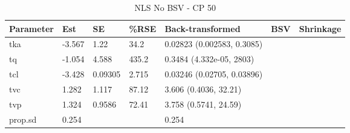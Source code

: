 \begin{table}
\centering\centering
\caption{NLS No BSV - CP 50}
\centering
\fontsize{8}{10}\selectfont
\begin{tabular}[t]{lllllll}
\toprule
\textbf{Parameter} & \textbf{Est} & \textbf{SE} & \textbf{\%RSE} & \textbf{Back-transformed} & \textbf{BSV} & \textbf{Shrinkage}\\
\midrule
tka & -3.567 & 1.22 & 34.2 & 0.02823 (0.002583, 0.3085) &  & \\
\midrule
tq & -1.054 & 4.588 & 435.2 & 0.3484 (4.332e-05, 2803) &  & \\
\midrule
tcl & -3.428 & 0.09305 & 2.715 & 0.03246 (0.02705, 0.03896) &  & \\
\midrule
tvc & 1.282 & 1.117 & 87.12 & 3.606 (0.4036, 32.21) &  & \\
\midrule
tvp & 1.324 & 0.9586 & 72.41 & 3.758 (0.5741, 24.59) &  & \\
\midrule
prop.sd & 0.254 &  &  & 0.254 &  & \\
\bottomrule
\end{tabular}
\end{table}